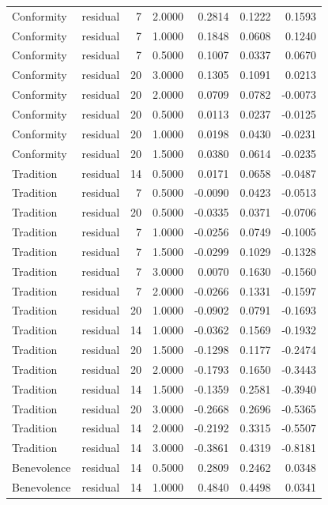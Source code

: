 \begin{tabular}{llrrrrr}
Conformity & residual & 7 & 2.0000 & 0.2814 & 0.1222 & 0.1593 \\
Conformity & residual & 7 & 1.0000 & 0.1848 & 0.0608 & 0.1240 \\
Conformity & residual & 7 & 0.5000 & 0.1007 & 0.0337 & 0.0670 \\
Conformity & residual & 20 & 3.0000 & 0.1305 & 0.1091 & 0.0213 \\
Conformity & residual & 20 & 2.0000 & 0.0709 & 0.0782 & -0.0073 \\
Conformity & residual & 20 & 0.5000 & 0.0113 & 0.0237 & -0.0125 \\
Conformity & residual & 20 & 1.0000 & 0.0198 & 0.0430 & -0.0231 \\
Conformity & residual & 20 & 1.5000 & 0.0380 & 0.0614 & -0.0235 \\
Tradition & residual & 14 & 0.5000 & 0.0171 & 0.0658 & -0.0487 \\
Tradition & residual & 7 & 0.5000 & -0.0090 & 0.0423 & -0.0513 \\
Tradition & residual & 20 & 0.5000 & -0.0335 & 0.0371 & -0.0706 \\
Tradition & residual & 7 & 1.0000 & -0.0256 & 0.0749 & -0.1005 \\
Tradition & residual & 7 & 1.5000 & -0.0299 & 0.1029 & -0.1328 \\
Tradition & residual & 7 & 3.0000 & 0.0070 & 0.1630 & -0.1560 \\
Tradition & residual & 7 & 2.0000 & -0.0266 & 0.1331 & -0.1597 \\
Tradition & residual & 20 & 1.0000 & -0.0902 & 0.0791 & -0.1693 \\
Tradition & residual & 14 & 1.0000 & -0.0362 & 0.1569 & -0.1932 \\
Tradition & residual & 20 & 1.5000 & -0.1298 & 0.1177 & -0.2474 \\
Tradition & residual & 20 & 2.0000 & -0.1793 & 0.1650 & -0.3443 \\
Tradition & residual & 14 & 1.5000 & -0.1359 & 0.2581 & -0.3940 \\
Tradition & residual & 20 & 3.0000 & -0.2668 & 0.2696 & -0.5365 \\
Tradition & residual & 14 & 2.0000 & -0.2192 & 0.3315 & -0.5507 \\
Tradition & residual & 14 & 3.0000 & -0.3861 & 0.4319 & -0.8181 \\
Benevolence & residual & 14 & 0.5000 & 0.2809 & 0.2462 & 0.0348 \\
Benevolence & residual & 14 & 1.0000 & 0.4840 & 0.4498 & 0.0341 \\

\end{tabular}
